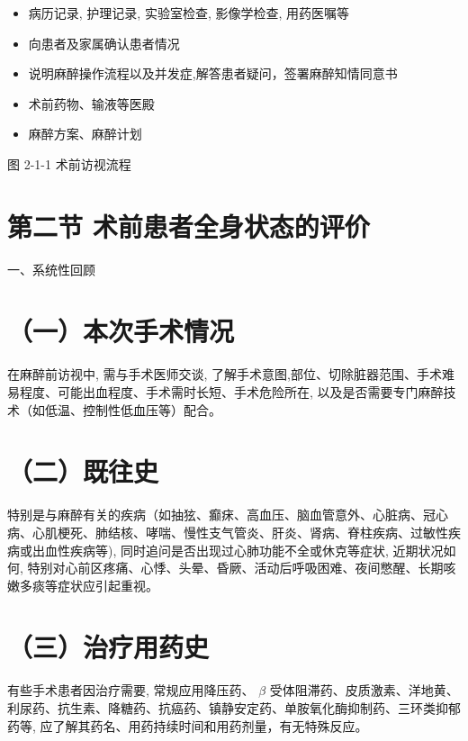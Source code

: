 \documentclass[10pt]{article}
\begin{document}
\begin{itemize}
  \item 病历记录, 护理记录, 实验室检查, 影像学检查, 用药医嘱等
  \item 向患者及家属确认患者情况
  \item 说明麻醉操作流程以及并发症,解答患者疑问，签署麻醉知情同意书
  \item 术前药物、输液等医殿
  \item 麻醉方案、麻醉计划
\end{itemize}

图 2-1-1 术前访视流程

\section*{第二节 术前患者全身状态的评价}
一、系统性回顾

\section*{（一）本次手术情况}
在麻醉前访视中, 需与手术医师交谈, 了解手术意图,部位、切除脏器范围、手术难易程度、可能出血程度、手术需时长短、手术危险所在, 以及是否需要专门麻醉技术（如低温、控制性低血压等）配合。

\section*{（二）既往史}
特别是与麻醉有关的疾病（如抽㹡、癫㾁、高血压、脑血管意外、心脏病、冠心病、心肌梗死、肺结核、哮喘、慢性支气管炎、肝炎、肾病、脊柱疾病、过敏性疾病或出血性疾病等), 同时追问是否出现过心肺功能不全或休克等症状, 近期状况如何, 特别对心前区疼痛、心悸、头晕、昏厥、活动后呼吸困难、夜间憋醒、长期咳嫩多痰等症状应引起重视。

\section*{（三）治疗用药史}
有些手术患者因治疗需要, 常规应用降压药、 $\beta$ 受体阻滞药、皮质激素、洋地黄、利尿药、抗生素、降糖药、抗癌药、镇静安定药、单胺氧化酶抑制药、三环类抑郁药等, 应了解其药名、用药持续时间和用药剂量，有无特殊反应。
\end{document}

